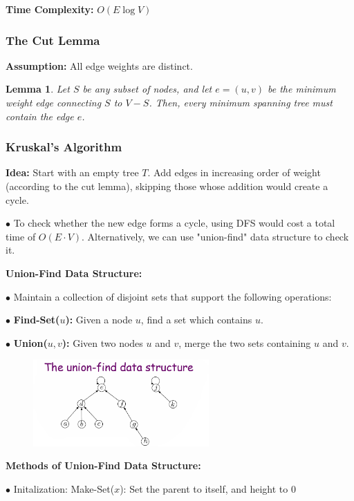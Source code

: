 \documentclass[10pt]{article}
\newtheorem*{lemma}{Lemma}
\begin{document}
\textbf{Time Complexity:} $O(E\log V)$

\subsubsection{The Cut Lemma}

\textbf{Assumption:} All edge weights are distinct.

\begin{lemma}
	Let $S$ be any subset of nodes, and let $e = (u, v)$ be the minimum weight edge connecting $S$ to $V-S$. Then, every minimum spanning tree must contain the edge $e$.
\end{lemma}

\subsubsection{Kruskal's Algorithm}

\textbf{Idea:} Start with an empty tree $T$. Add edges in increasing order of weight (according to the cut lemma), skipping those whose addition would create a cycle.

$\bullet$ To check whether the new edge forms a cycle, using DFS would cost a total time of $O(E\cdot V)$. Alternatively, we can use "union-find" data structure to check it.

\newpage
\textbf{Union-Find Data Structure:}

$\bullet$ Maintain a collection of disjoint sets that support the following operations:

$\bullet$ \textbf{Find-Set($u$):} Given a node $u$, find a set which contains $u$.

$\bullet$ \textbf{Union($u, v$):} Given two nodes $u$ and $v$, merge the two sets containing $u$ and $v$.

\begin{figure}[h]
	\centering
	\includegraphics[width=0.6\textwidth]{img7-2}
\end{figure}

\textbf{Methods of Union-Find Data Structure:}

$\bullet$ Initalization: Make-Set($x$): Set the parent to itself, and height to 0
\end{document}
